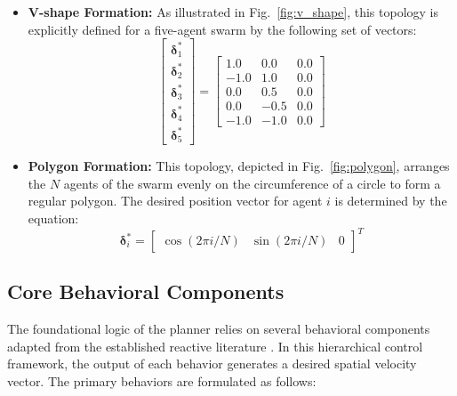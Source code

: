 \documentclass[pdflatex,sn-basic]{sn-jnl}%
\begin{document}
        \begin{itemize}
            \item \textbf{V-shape Formation:} As illustrated in Fig.~\ref{fig:v_shape}, this topology is explicitly defined for a five-agent swarm by the following set of vectors:
            \begin{equation}
            \label{eq:v_shape_matrix}
                \begin{bmatrix}
                    \boldsymbol{\delta}_{1}^{*} \\
                    \boldsymbol{\delta}_{2}^{*} \\
                    \boldsymbol{\delta}_{3}^{*} \\
                    \boldsymbol{\delta}_{4}^{*} \\
                    \boldsymbol{\delta}_{5}^{*}
                \end{bmatrix}
                =
                \begin{bmatrix}
                    1.0 & 0.0 & 0.0 \\
                    -1.0 & 1.0 & 0.0 \\
                    0.0 & 0.5 & 0.0 \\
                    0.0 & -0.5 & 0.0 \\
                    -1.0 & -1.0 & 0.0
                \end{bmatrix}
            \end{equation}

            \item \textbf{Polygon Formation:} This topology, depicted in Fig.~\ref{fig:polygon}, arranges the $N$ agents of the swarm evenly on the circumference of a circle to form a regular polygon. The desired position vector for agent $i$ is determined by the equation:
            \begin{equation}
                \boldsymbol{\delta}_{i}^{*} = \begin{bmatrix} \cos(2\pi i/N) & \sin(2\pi i/N) & 0 \end{bmatrix}^T
            \end{equation}
        \end{itemize}

    \subsection{Core Behavioral Components}
        The foundational logic of the planner relies on several behavioral components adapted from the established reactive literature \citep{bui_event-based_2025}. In this hierarchical control framework, the output of each behavior generates a desired spatial velocity vector. The primary behaviors are formulated as follows:
\end{document}
